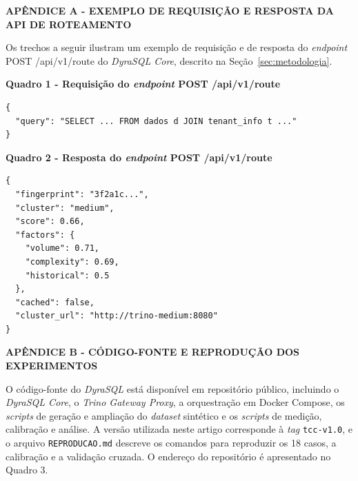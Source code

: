 \newpage

\begin{center}
\textbf{APÊNDICE A - EXEMPLO DE REQUISIÇÃO E RESPOSTA DA API DE ROTEAMENTO}
\end{center}

\vspace{0.5cm}

Os trechos a seguir ilustram um exemplo de requisição e de resposta do \textit{endpoint} POST /api/v1/route do \textit{DyraSQL Core}, descrito na Seção~\ref{sec:metodologia}.

\begin{center}
\textbf{Quadro 1 - Requisição do \textit{endpoint} POST /api/v1/route}
\end{center}

\begin{framed}
\begin{verbatim}
{
  "query": "SELECT ... FROM dados d JOIN tenant_info t ..."
}
\end{verbatim}
\end{framed}


\vspace{0.8cm}

\begin{center}
\textbf{Quadro 2 - Resposta do \textit{endpoint} POST /api/v1/route}
\end{center}

\begin{framed}
\begin{verbatim}
{
  "fingerprint": "3f2a1c...",
  "cluster": "medium",
  "score": 0.66,
  "factors": {
    "volume": 0.71,
    "complexity": 0.69,
    "historical": 0.5
  },
  "cached": false,
  "cluster_url": "http://trino-medium:8080"
}
\end{verbatim}
\end{framed}


\newpage

\begin{center}
\textbf{APÊNDICE B - CÓDIGO-FONTE E REPRODUÇÃO DOS EXPERIMENTOS}
\end{center}

\vspace{0.5cm}

O código-fonte do \textit{DyraSQL} está disponível em repositório público, incluindo o \textit{DyraSQL Core}, o \textit{Trino Gateway Proxy}, a orquestração em Docker Compose, os \textit{scripts} de geração e ampliação do \textit{dataset} sintético e os \textit{scripts} de medição, calibração e análise. A versão utilizada neste artigo corresponde à \textit{tag} \texttt{tcc-v1.0}, e o arquivo \texttt{REPRODUCAO.md} descreve os comandos para reproduzir os 18 casos, a calibração e a validação cruzada. O endereço do repositório é apresentado no Quadro 3.


